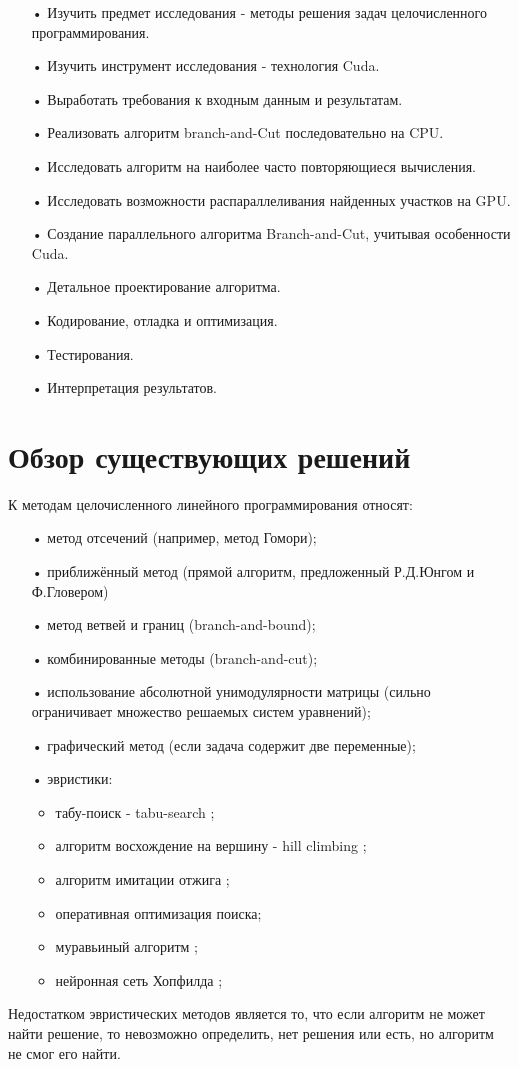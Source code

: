 \documentclass[a4paper,14pt,russian]{extreport}
\begin{document}
\begin{itemize}
\item[•] Изучить предмет исследования - методы решения задач целочисленного программирования.
\item[•] Изучить инструмент исследования - технология Cuda.
\item[•] Выработать требования к входным данным и результатам.
\item[•] Реализовать алгоритм branch-and-Cut последовательно на CPU.
\item[•] Исследовать алгоритм на наиболее часто повторяющиеся вычисления.
\item[•] Исследовать возможности распараллеливания найденных участков на GPU.
\item[•] Создание параллельного алгоритма Branch-and-Cut, учитывая особенности Cuda.
\item[•] Детальное проектирование алгоритма.
\item[•] Кодирование, отладка и оптимизация.
\item[•] Тестирования.
\item[•] Интерпретация результатов.
\end{itemize}

\section{Обзор существующих решений}
К методам целочисленного линейного программирования относят:
\begin{itemize}
\item[•] метод отсечений (например, метод Гомори);
\item[•] приближённый метод (прямой алгоритм, предложенный Р.Д.Юнгом и Ф.Гловером)
\item[•] метод ветвей и границ (branch-and-bound);
\item[•] комбинированные методы (branch-and-cut);
\item[•] использование абсолютной унимодулярности матрицы (сильно ограничивает множество решаемых систем уравнений);
\item[•] графический метод (если задача содержит две переменные);
\item[•] эвристики:
\begin{itemize}
\item табу-поиск - tabu-search \cite{glover};
\item алгоритм восхождение на вершину - hill climbing \cite{russell};
\item алгоритм имитации отжига \cite{kirkpatrick};
\item оперативная оптимизация поиска;
\item муравьиный алгоритм \cite{colorni};
\item нейронная сеть Хопфилда \cite{lau};
\end{itemize}
\end{itemize}
\par
Недостатком эвристических методов является то, что если алгоритм не может найти решение, то невозможно определить, нет решения или есть, но алгоритм не смог его найти. 
\par
\end{document}
